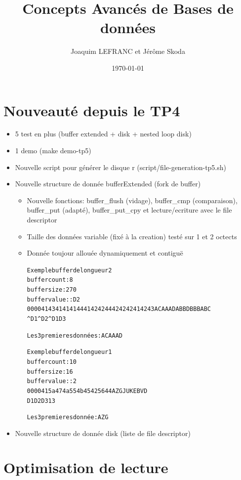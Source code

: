 \documentclass[a4paper]{article}
\title{Concepts Avancés de Bases de données}
\author{Joaquim LEFRANC et Jérôme Skoda}
\date{\today}
\begin{document}
\maketitle


\section{Nouveauté depuis le TP4}

\begin{itemize}
  \item 5 test en plus (buffer extended + disk + nested loop disk)
  \item 1 demo (make demo-tp5)
  \item Nouvelle script pour générer le disque r (script/file-generation-tp5.sh)
  \item Nouvelle structure de donnée bufferExtended (fork de buffer)
    \begin{itemize}
      \item Nouvelle fonctions: buffer\_flush (vidage), buffer\_cmp (comparaison), 
         buffer\_put (adapté), buffer\_put\_cpy et lecture/ecriture avec le file descriptor
      \item Taille des données variable (fixé à la creation) testé sur 1 et 2 octects
      \item Donnée toujour allouée dynamiquement et contiguë 
         \begin{alltt}
Exemple buffer de longueur 2
buffer count: 8
buffer size: 270
buffer value::                                             D2
  0000  41 43 41 41 41 44 41 42 42 44 42 42 42 41 42 43  ACAAADABBDBBBABC
       ^ D1  ^  D2 ^                                     D1  D3          

Les 3 premieres données: AC AA AD

Exemple buffer de longueur 1
buffer count: 10
buffer size: 16
buffer value::                                            2
  0000  41 5a 47 4a 55 4b 45 42 56 44                    AZGJUKEBVD
        D1 D2 D3                                         1 3
       
Les 3 premieres donnée: A Z G
\end{alltt}
    \end{itemize}
  \item Nouvelle structure de donnée disk (liste de file descriptor)
\end{itemize}

\section{Optimisation de lecture}
\end{document}
